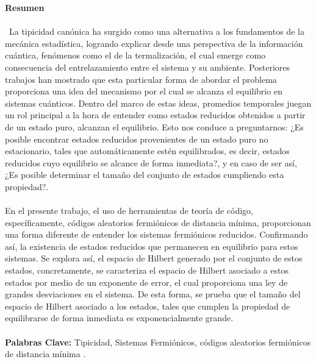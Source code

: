 \newpage{\pagestyle{empty}\cleardoublepage}
\newpage{}




\textbf{\LARGE Resumen}\\\\
\
La tipicidad canónica ha surgido como una alternativa a los fundamentos de la mecánica estadística, logrando explicar desde una perspectiva de la información cuántica, fenómenos como el de la termalización, el cual emerge como consecuencia del entrelazamiento entre el sistema y su ambiente.  Posteriores trabajos han mostrado que esta particular forma de abordar el problema proporciona una idea del mecanismo por el cual se alcanza el equilibrio en sistemas cuánticos. Dentro del marco de estas ideas, promedios temporales juegan un rol principal a la hora de entender como estados reducidos obtenidos a partir de un estado puro, alcanzan el equilibrio. Esto nos conduce a preguntarnos: ¿Es posible encontrar estados reducidos provenientes de un estado puro no estacionario, tales que automáticamente estén equilibrados, es decir, estados reducidos cuyo equilibrio se alcance de forma inmediata?, y en caso de ser así, ¿Es posible determinar el tamaño del conjunto de estados cumpliendo esta propiedad?.\\\\

En el presente trabajo, el uso de herramientas de teoría de código, específicamente, códigos aleatorios fermiónicos de distancia mínima, proporcionan una forma diferente de entender los sistemas fermiónicos reducidos. Confirmando así, la  existencia de estados reducidos que permanecen en equilibrio para estos sistemas. Se explora así, el espacio de Hilbert generado por el conjunto de estos estados, concretamente, se caracteriza el espacio de Hilbert asociado a estos estados por medio de un exponente de error, el cual proporciona una ley de grandes desviaciones en el sistema. De esta forma, se prueba que el tamaño del espacio de Hilbert asociado a los estados, tales que cumplen la propiedad de equilibrarse de forma inmediata es exponencialmente grande.\\\\
\textbf{\small Palabras Clave:} Tipicidad, Sistemas Fermiónicos, códigos aleatorios fermiónicos de distancia mínima .
\newpage{}

